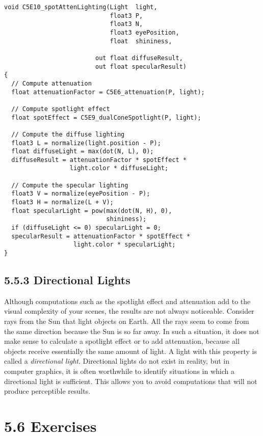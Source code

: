 \documentclass[../main.tex]{subfiles}
\begin{document}
\FloatBarrier
\begin{lstlisting}[caption=Example 5-10. The \textbf{C5E10_spotAttenLighting} Internal Function]
void C5E10_spotAttenLighting(Light  light,
                             float3 P,
                             float3 N,
                             float3 eyePosition,
                             float  shininess,

                         out float diffuseResult,
                         out float specularResult)
{
  // Compute attenuation
  float attenuationFactor = C5E6_attenuation(P, light);

  // Compute spotlight effect
  float spotEffect = C5E9_dualConeSpotlight(P, light);

  // Compute the diffuse lighting
  float3 L = normalize(light.position - P);
  float diffuseLight = max(dot(N, L), 0);
  diffuseResult = attenuationFactor * spotEffect *
                  light.color * diffuseLight;

  // Compute the specular lighting
  float3 V = normalize(eyePosition - P);
  float3 H = normalize(L + V);
  float specularLight = pow(max(dot(N, H), 0),
                            shininess);
  if (diffuseLight <= 0) specularLight = 0;
  specularResult = attenuationFactor * spotEffect *
                   light.color * specularLight;
}
\end{lstlisting}
\FloatBarrier

\subsection{5.5.3 Directional Lights}

Although computations such as the spotlight effect and attenuation add to the visual complexity of your scenes, the results are not always noticeable. Consider rays from the Sun that light objects on Earth. All the rays seem to come from the same direction because the Sun is so far away. In such a situation, it does not make sense to calculate a spotlight effect or to add attenuation, because all objects receive essentially the same amount of light. A light with this property is called a \textit{directional light}. Directional lights do not exist in reality, but in computer graphics, it is often worthwhile to identify situations in which a directional light is sufficient. This allows you to avoid computations that will not produce perceptible results.

\section{5.6 Exercises}
\end{document}
